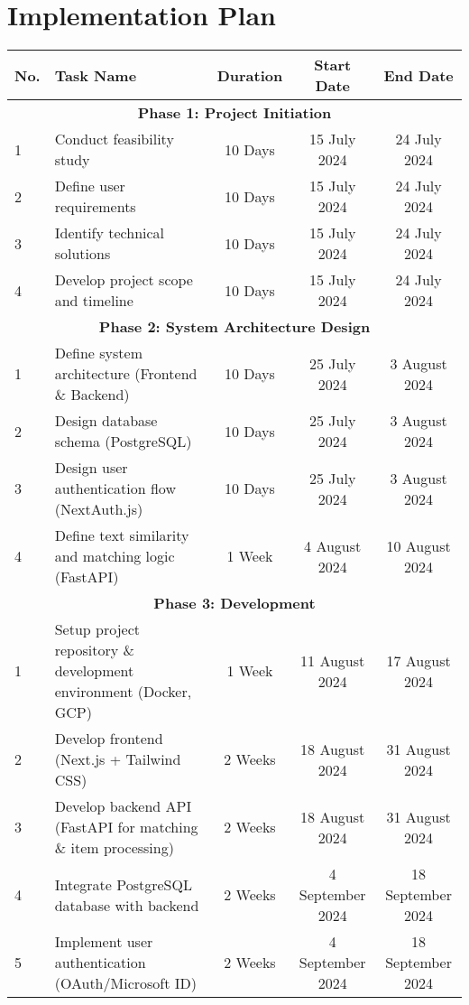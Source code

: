 \section{Implementation Plan}
\begin{table}[h!]
\centering
\begin{tabular}{|l|p{5cm}|c|c|c|}
\hline
\textbf{No.} & \textbf{Task Name} & \textbf{Duration} & \textbf{Start Date} & \textbf{End Date} \\ \hline
\multicolumn{5}{|c|}{\textbf{Phase 1: Project Initiation}} \\ \hline
1 & Conduct feasibility study & 10 Days & 15 July 2024 & 24 July 2024 \\ \hline
2 & Define user requirements & 10 Days & 15 July 2024 & 24 July 2024 \\ \hline
3 & Identify technical solutions & 10 Days & 15 July 2024 & 24 July 2024 \\ \hline
4 & Develop project scope and timeline & 10 Days & 15 July 2024 & 24 July 2024 \\ \hline
\multicolumn{5}{|c|}{\textbf{Phase 2: System Architecture Design}} \\ \hline
1 & Define system architecture (Frontend \& Backend) & 10 Days & 25 July 2024 & 3 August 2024 \\ \hline
2 & Design database schema (PostgreSQL) & 10 Days & 25 July 2024 & 3 August 2024 \\ \hline
3 & Design user authentication flow (NextAuth.js) & 10 Days & 25 July 2024 & 3 August 2024 \\ \hline
4 & Define text similarity and matching logic (FastAPI) & 1 Week & 4 August 2024 & 10 August 2024 \\ \hline
\multicolumn{5}{|c|}{\textbf{Phase 3: Development}} \\ \hline
1 & Setup project repository \& development environment (Docker, GCP) & 1 Week & 11 August 2024 & 17 August 2024 \\ \hline
2 & Develop frontend (Next.js + Tailwind CSS) & 2 Weeks & 18 August 2024 & 31 August 2024 \\ \hline
3 & Develop backend API (FastAPI for matching \& item processing) & 2 Weeks & 18 August 2024 & 31 August 2024 \\ \hline
4 & Integrate PostgreSQL database with backend & 2 Weeks & 4 September 2024 & 18 September 2024 \\ \hline
5 & Implement user authentication (OAuth/Microsoft ID) & 2 Weeks & 4 September 2024 & 18 September 2024 \\ \hline

\end{tabular}
\end{table}
